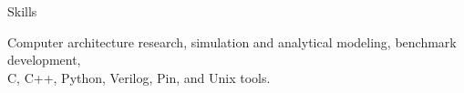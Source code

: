 \documentclass{resume} %
\begin{document}

\begin{rSection}{Skills}

Computer architecture research, simulation and analytical modeling, benchmark development, \\
C, C++, Python, Verilog, Pin, and Unix tools. \\

\end{rSection}








\end{document}

